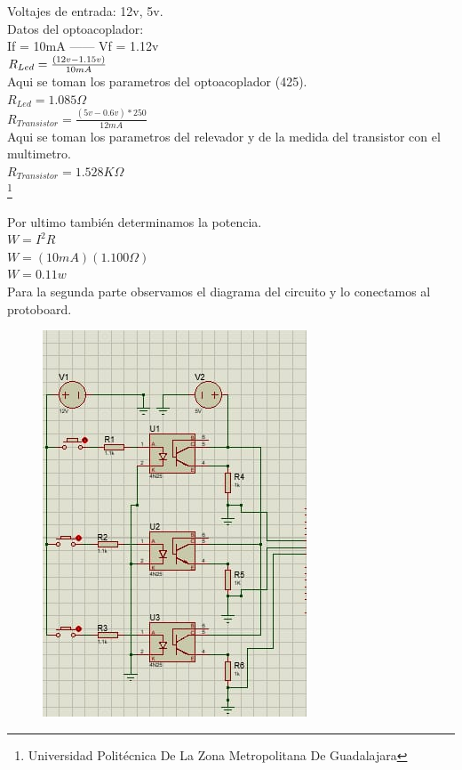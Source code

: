 \documentclass[10pt,a4paper]{article}
\begin{document}
Voltajes de entrada: 12v, 5v.\\

Datos del optoacoplador:\\

If = 10mA ------
Vf = 1.12v\\

{\Large $ R_{Led} = {\Large \frac{(12v - 1.15v)}{10mA}}$} \\Aqui se toman los parametros del optoacoplador (425).\\

{\Large $R_{Led} = 1.085\Omega$}\\

{\Large $R_{Transistor} = \frac{(5v - 0.6v)*250}{12mA}$}\\ Aqui se toman los parametros del relevador y de la medida del transistor con el multimetro.\\

{\Large $R_{Transistor} = 1.528K\Omega$}\\

\footnote{Universidad Politécnica De La Zona Metropolitana De Guadalajara}
\newpage

Por ultimo también determinamos la potencia.\\

$ W = I^2 R $\\ 

$ W = (10mA)(1.100\Omega)$\\

$ W = 0.11w $\\

Para la segunda parte observamos el diagrama del circuito y lo conectamos al protoboard.

\begin{figure}[hbtp]
\centering
\includegraphics[scale=0.60]{entrada.png} 
\end{figure}
\end{document}

